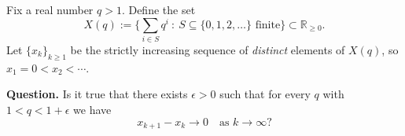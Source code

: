 \smallskip
\noindent
Fix a real number $q>1$. Define the set
\[
X(q):=\Big\{\sum_{i\in S} q^i\ :\ S\subseteq \{0,1,2,\dots\}\text{ finite}\Big\}\subset\mathbb{R}_{\ge 0}.
\]
Let $\{x_k\}_{k\ge 1}$ be the strictly increasing sequence of \emph{distinct} elements of $X(q)$, so $x_1=0<x_2<\cdots$.

\smallskip
\noindent
\textbf{Question.}
Is it true that there exists $\epsilon>0$ such that for every $q$ with $1<q<1+\epsilon$ we have
\[
 x_{k+1}-x_k\to 0\quad\text{as }k\to\infty?
\]
